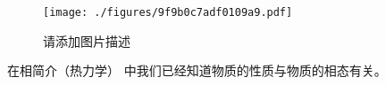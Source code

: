 
\begin{figure}[ht]
\centering
\texttt{[image: ./figures/9f9b0c7adf0109a9.pdf]}
\caption{请添加图片描述} \label{fig_PTTVC2_1}
\end{figure}

在相简介（热力学） 中我们已经知道物质的性质与物质的相态有关。